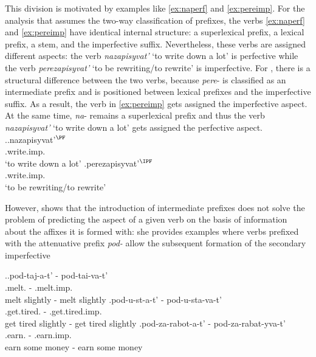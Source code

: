 This division is motivated by examples like \ref{ex:naperf} and \ref{ex:pereimp}. For the analysis that assumes the two-way classification of prefixes, the verbs \ref{ex:naperf} and \ref{ex:pereimp} have identical internal structure: a superlexical prefix, a lexical prefix, a stem, and the imperfective suffix. Nevertheless, these verbs are assigned different aspects: the verb \textit{nazapisyvat'} `to write down a lot' is perfective while the verb \textit{perezapisyvat'} `to be rewriting/to rewrite' is imperfective. For \citet{Tatevosov:07}, there is a structural difference between the two verbs, because \textit{pere}- is classified as an intermediate prefix and is positioned between lexical prefixes and the imperfective suffix. As a result, the verb in \ref{ex:pereimp} gets assigned the imperfective aspect. At the same time, \textit{na}- remains a superlexical prefix and thus the verb \textit{nazapisyvat'} `to write down a lot' gets assigned the perfective aspect.
\ex.\ag.\label{ex:naperf}nazapisyvat'$^{{\PF}}$\\
.write.imp.\\
`to write down a lot'
\bg.\label{ex:pereimp}perezapisyvat'$^{{\IPF}}$\\
.write.imp.\\
`to be rewriting/to rewrite'

However, \cite{Kagan:book} shows that the introduction of intermediate prefixes does not solve the problem of predicting the aspect of a given verb on the basis of information about the affixes it is formed with: she provides examples where verbs prefixed with the attenuative prefix \textit{pod-} allow the subsequent formation of the secondary imperfective \citep[35, ex.~\ref{ex:pod} here]{Kagan:book}

\ex.\label{ex:pod}\ag.pod-taj-a-t' - pod-tai-va-t'\\
.melt. - .melt.imp.\\
melt slightly\textsuperscript{\PF} - melt slightly\textsuperscript{\IPF}
\bg.\label{ex:podustavat'}pod-u-st-a-t' - pod-u-sta-va-t'\\
.get.tired. - .get.tired.imp.\\
get tired slightly\textsuperscript{\PF} - get tired slightly\textsuperscript{\IPF}
\bg.\label{ex:podzarabatyvat'}pod-za-rabot-a-t' - pod-za-rabat-yva-t'\\
.earn. - .earn.imp.\\
earn some money\textsuperscript{\PF} - earn some money\textsuperscript{\IPF}

